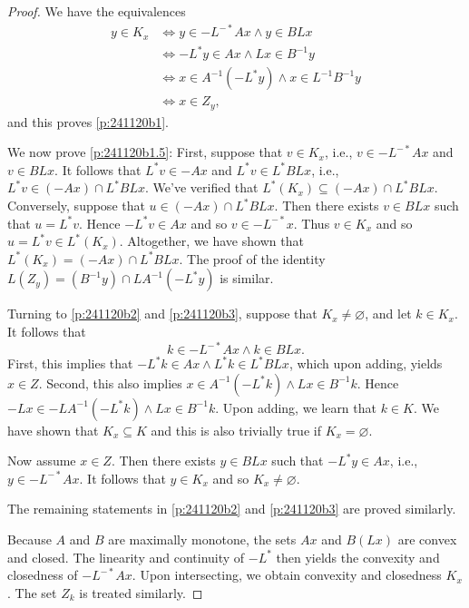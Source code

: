 \documentclass[10pt,a4paper]{amsart}
\providecommand{\siff}{\Leftrightarrow}
\begin{document}
\begin{proof}
We have the equivalences
\begin{subequations}
\begin{align}
y\in K_x
&\siff
y\in -L^{-*}Ax \land y \in BLx\\
&\siff
-L^*y \in Ax \land Lx \in B^{-1}y\\
&\siff
x \in A^{-1}(-L^*y) \land x \in L^{-1}B^{-1}y\\
&\siff
x\in Z_y,
\end{align}
\end{subequations}
and this proves \cref{p:241120b1}.

We now prove \cref{p:241120b1.5}:
First, suppose that $v\in K_x$, i.e., 
$v\in-L^{-*}Ax$ and $v\in BLx$.
It follows that $L^*v\in -Ax$ and $L^*v\in L^*BLx$, i.e., 
$L^*v \in (-Ax)\cap L^*BLx$. 
We've verified that $L^*(K_x)\subseteq (-Ax)\cap L^*BLx$. 
Conversely, suppose that $u\in (-Ax)\cap L^*BLx$. 
Then there exists $v\in BLx$ such that $u=L^*v$. 
Hence $-L^*v\in Ax$ and so $v\in -L^{-*}x$. 
Thus $v\in K_x$ and so $u = L^*v \in L^*(K_x)$. 
Altogether, we have shown that $L^*(K_x) = (-Ax)\cap L^*BLx$. 
The proof of the identity 
$L(Z_y)= (B^{-1}y)\cap LA^{-1}(-L^*y)$ is similar. 


Turning to \cref{p:241120b2} and \cref{p:241120b3}, 
suppose that 
$K_x\neq\varnothing$, and let $k\in K_x$. 
It follows that 
\begin{equation}
k\in -L^{-*}Ax \land k \in BLx.
\end{equation}
First, this implies that 
$-L^*k \in Ax \land L^*k\in L^*BLx$, which upon adding, yields 
$x \in Z$. 
Second, this also implies 
$x \in A^{-1}(-L^*k) \land Lx \in B^{-1}k$. 
Hence $-Lx \in -LA^{-1}(-L^*k) \land Lx \in B^{-1}k$. 
Upon adding, we learn that $k\in K$. 
We have shown that $K_x \subseteq K$ and this is also trivially true 
if $K_x=\varnothing$. 

Now assume $x\in Z$. 
Then there exists $y\in BLx$ such that 
$-L^*y\in Ax$, i.e., $y\in -L^{-*}Ax$.
It follows that $y \in K_x$ and so $K_x\neq\varnothing$. 

The remaining statements in \cref{p:241120b2} and \cref{p:241120b3}
are proved similarly.

Because $A$ and $B$ are maximally monotone, 
the sets 
$Ax$ and $B(Lx)$ are convex and closed. 
The linearity and continuity of $-L^*$ then 
yields the convexity and closedness of $-L^{-*}Ax$.
Upon intersecting, we obtain  convexity and closedness $K_x$. 
The set $Z_k$ is treated similarly. 
\end{proof}
\end{document}
